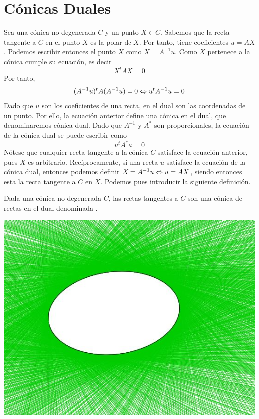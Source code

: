 \section{Cónicas Duales}
Sea una cónica no degenerada $C$ y un punto $X\in C$. Sabemos que la recta tangente a $C$ en el punto $X$ es la polar de $X$. Por tanto, tiene coeficientes $u=AX$. Podemos escribir entonces el punto $X$ como $X=A^{-1}u$. Como $X$ pertenece a la cónica cumple su ecuación, es decir
\[X^tAX=0\]
Por tanto,
\[(A^{-1}u)^tA(A^{-1}u)=0\Leftrightarrow u^tA^{-1}u=0\]
Dado que $u$ son los coeficientes de una recta, en el dual son las coordenadas de un punto. Por ello, la ecuación anterior define una cónica en el dual, que denominaremos cónica dual. Dado que $A^{-1}$ y $A^*$ son proporcionales, la ecuación de la cónica dual se puede escribir como
\begin{equation}\label{C8_eq_conicadual}
	u^tA^*u=0
\end{equation}
Nótese que cualquier recta tangente a la cónica $C$ satisface la ecuación anterior, pues $X$ es arbitrario. Recíprocamente, si una recta $u$ satisface la ecuación de la cónica dual, entonces podemos definir $X=A^{-1}u\Leftrightarrow u=AX$, siendo entonces esta la recta tangente a $C$ en $X$. Podemos pues introducir la siguiente definición.
\begin{defi}
	Dada una cónica no degenerada $C$, las rectas tangentes a $C$ son una cónica de rectas en el dual denominada .
\end{defi}
\begin{center}
	\includegraphics[scale=.45]{Graficos/Conicas/ConicaDual.jpg}
\end{center}
